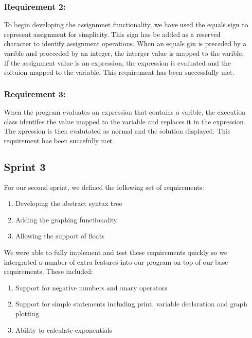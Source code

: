 \documentclass[a4paper, oneside, 11pt]{report}
\begin{document}
\subsubsection{Requirement 2: }

To begin developing the assignmnet functionality, we have used the equals sign to represent assignment for simplicity. This sign has be added as a reserved character to identify assignment operations. When an equals gin is preceded by a varible and proceeded by an integer, the interger value is mapped to the varible. If the assignment value is an expression, the expression is evaluated and the soltuion mapped to the variable.
This requirement has been successfully met.

\subsubsection{Requirement 3: }

When the program evaluates an expression that contains a varible, the execution class identifes the value mapped to the variable and replaces it in the expression. The xpression is then evalutated as normal and the solution displayed.
This requirement has been succefully met.

\subsection{Sprint 3}

For our second sprint, we defined the following set of requirements:

\begin{enumerate}
\item Developing the abstract syntax tree
\item Adding the graphing functionality
\item Allowing the support of floats
\end{enumerate}

We were able to fully implement and test these requirements quickly so we intergrated
a number of extra features into our program on top of our base requirements. These
included:
\begin{enumerate}
\item Support for negative numbers and unary operators
\item Support for simple statements including print, variable declaration and graph plotting
\item  Ability to calculate exponentials
\end{enumerate}
\end{document}
